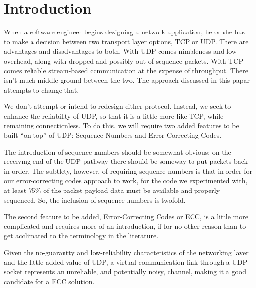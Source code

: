 \documentclass[conference]{IEEEtran}
\theoremstyle{definition}
\begin{document}
%
\IEEEpeerreviewmaketitle



\section{Introduction}
When a software engineer begins designing a
network application, he or she has to make a decision between
two transport layer options, TCP or UDP.  There are advantages
and disadvantages to both.  With UDP comes nimbleness and low
overhead, along with dropped and possibly out-of-sequence 
packets.  With TCP comes reliable stream-based communication
at the expense of throughput.  There isn't much middle ground
between the two.  The approach discussed in this papar attempts
to change that.

We don't attempt or intend to redesign either protocol.  Instead,
we seek to enhance the reliability of UDP, so that it is a little
more like TCP, while remaining connectionless.  To do this, we
will require two added features to be built ``on top'' of UDP:
Sequence Numbers and Error-Correcting Codes.

The introduction of sequence numbers should be somewhat obvious;
on the receiving end of the UDP pathway there should be someway
to put packets back in order.  The subtlety, however, of requiring
sequence numbers is that in order for our error-correcting codes
approach to work, for the code we experimented with, at least 75\%
of the packet payload data must be available and properly
sequenced.  So, the inclusion of sequence numbers is twofold.

The second feature to be added, Error-Correcting Codes or ECC, is a
little more complicated and requires more of an introduction,
if for no other reason than to get acclimated to the terminology
in the literature.

Given the no-guarantty and low-reliability characteristics of
the networking layer and the little added value of UDP,
a virtual communication link through a UDP socket represents
an unreliable, and potentially noisy, channel, making it
a good candidate for a ECC solution.
\end{document}
